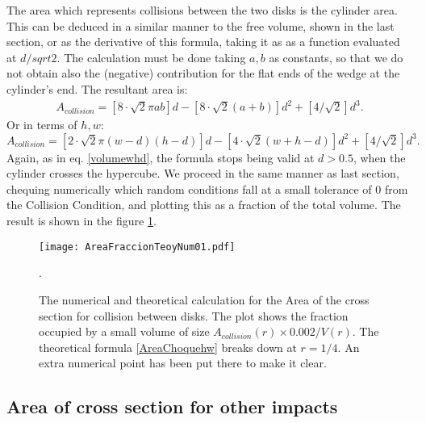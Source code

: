 \documentclass[a4paper,10pt]{article}
\begin{document}
The area which represents collisions between the two disks is the cylinder area. 
This can be deduced in a similar manner to the free volume, shown in the last
section, or as the derivative of this formula, taking it as as a function evaluated at 
$d/sqrt{2}$. The calculation must be done taking $a,b$ as constants, so that
we do not obtain also the (negative) contribution for the flat ends of
the wedge at the cylinder's end. The resultant area is:
\begin{align}\label{AreaChoque}
A_{collision} =[8\cdot \sqrt{2}  \pi ab] d
-[8 \cdot  \sqrt{2} (a+b)] d^2
+ [4 / \sqrt{2}] d^3.
\end{align}
Or in terms of $h, w$:
\begin{equation}\label{AreaChoquehw}
A_{collision} =[2\cdot \sqrt{2}  \pi (w-d)(h-d)] d
-[4 \cdot  \sqrt{2} (w+h-d)] d^2
+ [4 / \sqrt{2}] d^3.
\end{equation}
Again, as in eq. \ref{volumewhd}, the formula stops being valid
at $d>0.5$, when the cylinder crosses the hypercube.  
We proceed in the same manner as last section, chequing numerically which
random
conditions fall at a small tolerance of $0$ from the Collision Condition, and
plotting this as a fraction of the total volume. The result is shown in the
figure \ref{AreaChoqueTeoyNum}. 

\begin{figure}
\centering
\texttt{[image: AreaFraccionTeoyNum01.pdf]}
\caption{The numerical and theoretical calculation for the Area of the cross section
for collision between disks. The plot shows the fraction occupied by a small volume
of size $A_{collision}(r)\times 0.002/V(r)$. The theoretical formula \ref{AreaChoquehw} breaks down at
$r=1/4$. An extra numerical point has been put there to make it clear.}
\label{AreaChoqueTeoyNum}.
\end{figure}



\subsection{Area of cross section for other impacts}
\end{document}

